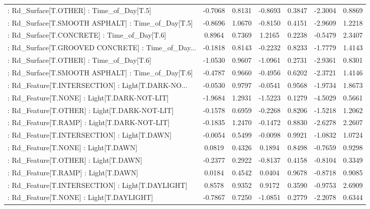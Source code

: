 \begin{longtable}{p{4cm}cccccc}
 : Rd\_Surface[T.OTHER] : Time\_of\_Day[T.5]          & -0.7068 &    0.8131 & -0.8693 &       0.3847 & -2.3004 &  0.8869 \\
 : Rd\_Surface[T.SMOOTH ASPHALT] : Time\_of\_Day[T.5] & -0.8696 &    1.0670 & -0.8150 &       0.4151 & -2.9609 &  1.2218 \\
 : Rd\_Surface[T.CONCRETE] : Time\_of\_Day[T.6]       &  0.8964 &    0.7369 &  1.2165 &       0.2238 & -0.5479 &  2.3407 \\
 : Rd\_Surface[T.GROOVED CONCRETE] : Time\_of\_Day... & -0.1818 &    0.8143 & -0.2232 &       0.8233 & -1.7779 &  1.4143 \\
 : Rd\_Surface[T.OTHER] : Time\_of\_Day[T.6]          & -1.0530 &    0.9607 & -1.0961 &       0.2731 & -2.9361 &  0.8301 \\
 : Rd\_Surface[T.SMOOTH ASPHALT] : Time\_of\_Day[T.6] & -0.4787 &    0.9660 & -0.4956 &       0.6202 & -2.3721 &  1.4146 \\
 : Rd\_Feature[T.INTERSECTION] : Light[T.DARK-NO... & -0.0530 &    0.9797 & -0.0541 &       0.9568 & -1.9734 &  1.8673 \\
 : Rd\_Feature[T.NONE] : Light[T.DARK-NOT-LIT]      & -1.9684 &    1.2931 & -1.5223 &       0.1279 & -4.5029 &  0.5661 \\
 : Rd\_Feature[T.OTHER] : Light[T.DARK-NOT-LIT]     & -0.1578 &    0.6959 & -0.2268 &       0.8206 & -1.5218 &  1.2062 \\
 : Rd\_Feature[T.RAMP] : Light[T.DARK-NOT-LIT]      & -0.1835 &    1.2470 & -0.1472 &       0.8830 & -2.6278 &  2.2607 \\
 : Rd\_Feature[T.INTERSECTION] : Light[T.DAWN]      & -0.0054 &    0.5499 & -0.0098 &       0.9921 & -1.0832 &  1.0724 \\
 : Rd\_Feature[T.NONE] : Light[T.DAWN]              &  0.0819 &    0.4326 &  0.1894 &       0.8498 & -0.7659 &  0.9298 \\
 : Rd\_Feature[T.OTHER] : Light[T.DAWN]             & -0.2377 &    0.2922 & -0.8137 &       0.4158 & -0.8104 &  0.3349 \\
 : Rd\_Feature[T.RAMP] : Light[T.DAWN]              &  0.0184 &    0.4542 &  0.0404 &       0.9678 & -0.8718 &  0.9085 \\
 : Rd\_Feature[T.INTERSECTION] : Light[T.DAYLIGHT]  &  0.8578 &    0.9352 &  0.9172 &       0.3590 & -0.9753 &  2.6909 \\
 : Rd\_Feature[T.NONE] : Light[T.DAYLIGHT]          & -0.7867 &    0.7250 & -1.0851 &       0.2779 & -2.2078 &  0.6344 \\

\end{longtable}
